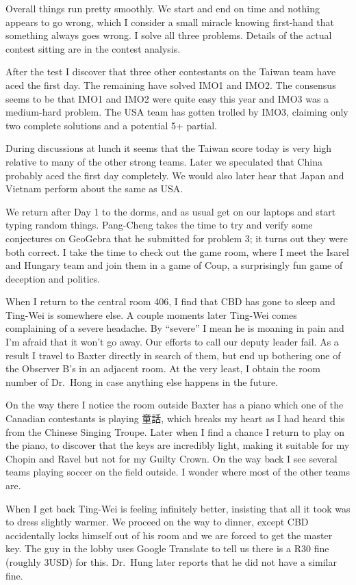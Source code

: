 \documentclass[11pt]{scrreprt}
\numberwithin{figure}{chapter}
\begin{document}
Overall things run pretty smoothly. We start and end on time and nothing appears to go wrong, which I consider a small miracle knowing first-hand that something always goes wrong.
I solve all three problems.
Details of the actual contest sitting are in the contest analysis.

After the test I discover that three other contestants on the Taiwan team have aced the first day. The remaining have solved IMO1 and IMO2. The consensus seems to be that IMO1 and IMO2 were quite easy this year and IMO3 was a medium-hard problem.
The USA team has gotten trolled by IMO3, claiming only two complete solutions and a potential 5+ partial.

During discussions at lunch it seems that the Taiwan score today is very high relative to many of the other strong teams.
Later we speculated that China probably aced the first day completely.
We would also later hear that Japan and Vietnam perform about the same as USA.

We return after Day 1 to the dorms, and as usual get on our laptops and start typing random things.
Pang-Cheng takes the time to try and verify some conjectures on GeoGebra
that he submitted for problem 3; it turns out they were both correct.
I take the time to check out the game room, where I meet the Isarel and Hungary team and join them in a game of Coup,
a surprisingly fun game of deception and politics.

When I return to the central room 406, I find that CBD has gone to sleep and Ting-Wei is somewhere else.
A couple moments later Ting-Wei comes complaining of a severe headache.
By ``severe'' I mean he is moaning in pain and I'm afraid that it won't go away.
Our efforts to call our deputy leader fail.
As a result I travel to Baxter directly in search of them, but end up
bothering one of the Observer B's in an adjacent room.
At the very least, I obtain the room number of Dr.\ Hong in case anything
else happens in the future.

On the way there I notice the room outside Baxter has a piano
which one of the Canadian contestants is playing 童話, which breaks
my heart as I had heard this from the Chinese Singing Troupe.
Later when I find a chance I return to play on the piano, to discover that
the keys are incredibly light, making it suitable for my Chopin and Ravel
but not for my Guilty Crown.
On the way back I see several teams playing soccer on the field outside.
I wonder where most of the other teams are.

When I get back Ting-Wei is feeling infinitely better, insisting that all
it took was to dress slightly warmer.
We proceed on the way to dinner, except CBD accidentally locks himself out of his room and we are forced to get the master key.
The guy in the lobby  uses Google Translate to tell us there is a R30 fine (roughly 3USD)
for this. Dr.\ Hung later reports that he did not have a similar fine.
\end{document}
